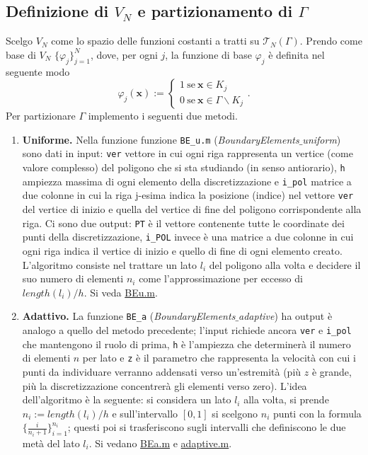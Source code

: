 \subsection{Definizione di $V_N$ e partizionamento di $\Gamma$}
Scelgo $V_N$ come lo spazio delle funzioni costanti a tratti su $\mathcal{T}_N(\Gamma)$. Prendo come base di $V_N$ $\{\varphi_j\}_{j=1}^N$, dove, per ogni $j$, la funzione di base $\varphi_j$ è definita nel seguente modo 
\[ \varphi_j(\textbf{x}) := \begin{cases}
	1 \ \text{se} \ \textbf{x}\in K_j \\ 0 \ \text{se} \ \textbf{x}\in \Gamma \backslash K_j
\end{cases}. \]
Per partizionare $\Gamma$ implemento i seguenti due metodi.
\begin{enumerate}
	\item \textbf{Uniforme.} Nella funzione funzione \verb|BE_u.m| (\textit{BoundaryElements$\_$uniform}) sono dati in input: \verb|ver| vettore in cui ogni riga rappresenta un vertice (come valore complesso) del poligono che si sta studiando (in senso antiorario), \verb|h| ampiezza massima di ogni elemento della discretizzazione e \verb|i_pol| matrice a due colonne in cui la riga j-esima indica la posizione (indice) nel vettore \verb|ver| del vertice di inizio e quella del vertice di fine del poligono corrispondente alla riga. Ci sono due output: \verb|PT| è il vettore contenente tutte le coordinate dei punti della discretizzazione, \verb|i_POL| invece è una matrice a due colonne in cui ogni riga indica il vertice di inizio e quello di fine di ogni elemento creato. L'algoritmo consiste nel trattare un lato $l_i$ del poligono alla volta e decidere il suo numero di elementi $n_i$ come l'approssimazione per eccesso di $length(l_i) / h$. Si veda \href{https://github.com/Daldossi/BEM/blob/main/BE_u.m}{BEu.m}.
	\item \textbf{Adattivo.} La funzione \verb|BE_a| (\textit{BoundaryElements$\_$adaptive}) ha output è analogo a quello del metodo precedente; l'input richiede ancora \verb|ver| e \verb|i_pol| che mantengono il ruolo di prima, \verb|h| è l'ampiezza che determinerà il numero di elementi $n$ per lato e \verb|z| è il parametro che rappresenta la velocità con cui i punti da individuare verranno addensati verso un'estremità (più $z$ è grande, più la discretizzazione concentrerà gli elementi verso zero). L'idea dell'algoritmo è la seguente: si considera un lato $l_i$ alla volta, si prende $n_i := length(l_i) / h$ e sull'intervallo $[0,1]$ si scelgono $n_i$ punti con la formula $\{\frac{i}{n_i+1}\}_{i=1}^{n_i}$; questi poi si trasferiscono sugli intervalli che definiscono le due metà del lato $l_i$. Si vedano \href{https://github.com/Daldossi/BEM/blob/main/BE_a.m}{BEa.m} e \href{https://github.com/Daldossi/BEM/blob/main/adaptive.m}{adaptive.m}.
\end{enumerate}
